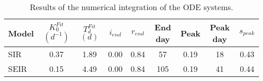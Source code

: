 \begin{table}[h]
\centering
\caption{Results of the numerical integration of the ODE systems.}
\label{tab:models}
\begin{tabular}{lcccccccc}
\toprule
           Model & $K_0^{Fit}$ $(d^{-1})$ & $T_d^{Fit}$ $(d)$ & $i_{end}$ & $r_{end}$ & End day & Peak  & Peak day & $s_{peak}$\\
\midrule
SIR &               0.37 &              1.89 &      0.00 &      0.84 &             57 &      0.19 &              18   &   0.43 \\
SEIR &              0.15 &              4.49 &      0.00 &      0.84 &            105 &      0.19 &              41   &   0.44 \\
\bottomrule
\end{tabular}
\end{table}